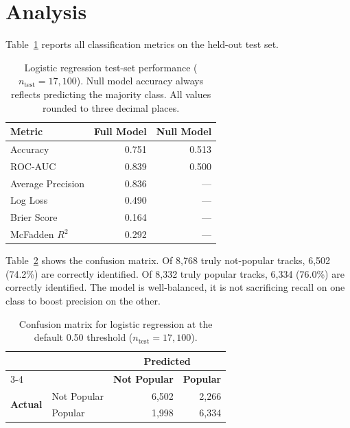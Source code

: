 \documentclass[12pt, oneside]{book}
\begin{document}
\section{Analysis}
 
Table~\ref{tab:ch5_metrics} reports all classification metrics on the held-out test set.
 
\begin{table}[H]
\centering
\caption{Logistic regression test-set performance ($n_{\text{test}} = 17{,}100$). Null model accuracy always reflects predicting the majority class. All values rounded to three decimal places.}
\label{tab:ch5_metrics}
\begin{tabular}{lrr}
\toprule
\textbf{Metric} & \textbf{Full Model} & \textbf{Null Model} \\
\midrule
Accuracy       & 0.751 & 0.513 \\
ROC-AUC        & 0.839 & 0.500 \\
Average Precision & 0.836 & --- \\
Log Loss       & 0.490 & --- \\
Brier Score    & 0.164 & --- \\
McFadden $R^2$ & 0.292 & --- \\
\bottomrule
\end{tabular}
\end{table}
 
Table~\ref{tab:ch5_confusion} shows the confusion matrix. Of 8{,}768 truly not-popular tracks, 6{,}502 (74.2\%) are correctly identified. Of 8{,}332 truly popular tracks, 6{,}334 (76.0\%) are correctly identified. The model is well-balanced, it is not sacrificing recall on one class to boost precision on the other.
 
\begin{table}[H]
\centering
\caption{Confusion matrix for logistic regression at the default 0.50 threshold ($n_{\text{test}} = 17{,}100$).}
\label{tab:ch5_confusion}
\begin{tabular}{llrr}
\toprule
& & \multicolumn{2}{c}{\textbf{Predicted}} \\
\cmidrule{3-4}
& & \textbf{Not Popular} & \textbf{Popular} \\
\midrule
\multirow{2}{*}{\textbf{Actual}} & Not Popular & 6{,}502 & 2{,}266 \\
& Popular     & 1{,}998 & 6{,}334 \\
\bottomrule
\end{tabular}
\end{table}
 
\end{document}
